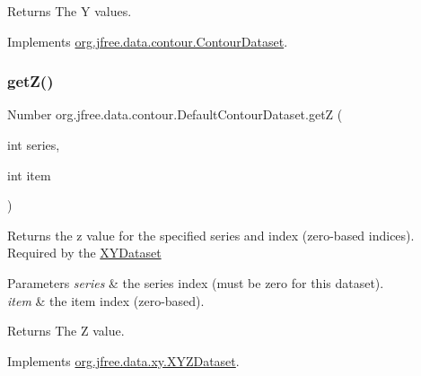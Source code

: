 \begin{DoxyReturn}{Returns}
The Y values. 
\end{DoxyReturn}


Implements \mbox{\hyperlink{interfaceorg_1_1jfree_1_1data_1_1contour_1_1_contour_dataset_a0faf9e126a0ff7c38e59c2f56cec0ee9}{org.\+jfree.\+data.\+contour.\+Contour\+Dataset}}.

\mbox{\label{classorg_1_1jfree_1_1data_1_1contour_1_1_default_contour_dataset_a47bf3f8c5cf2bb06f7243b2e159c3978}} 
\subsubsection{\texorpdfstring{get\+Z()}{getZ()}}
{\footnotesize\ttfamily Number org.\+jfree.\+data.\+contour.\+Default\+Contour\+Dataset.\+getZ (\begin{DoxyParamCaption}\item[{int}]{series,  }\item[{int}]{item }\end{DoxyParamCaption})}

Returns the z value for the specified series and index (zero-\/based indices). Required by the \mbox{\hyperlink{}{X\+Y\+Dataset}}


\begin{DoxyParams}{Parameters}
{\em series} & the series index (must be zero for this dataset). \\
\hline
{\em item} & the item index (zero-\/based).\\
\hline
\end{DoxyParams}
\begin{DoxyReturn}{Returns}
The Z value. 
\end{DoxyReturn}


Implements \mbox{\hyperlink{interfaceorg_1_1jfree_1_1data_1_1xy_1_1_x_y_z_dataset_a6a6e1c88cc1ca7cfa31c2fa043521c8a}{org.\+jfree.\+data.\+xy.\+X\+Y\+Z\+Dataset}}.

\mbox{\label{classorg_1_1jfree_1_1data_1_1contour_1_1_default_contour_dataset_a516b578d400a06e81eb12e13c2146e59}} 
